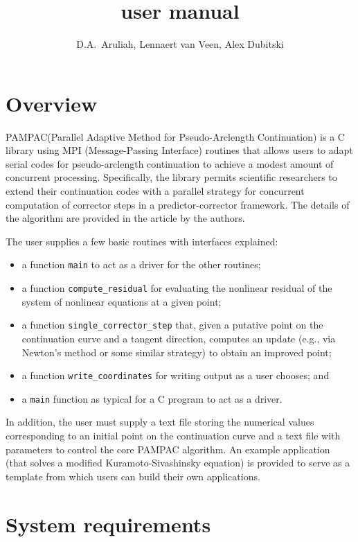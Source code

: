 \documentclass{article}
\title{\pampac user manual}
\author{D.A.~Aruliah, Lennaert van Veen, Alex Dubitski}
\date{}
\newcommand{\pampac}{\textsc{PAMPAC}\xspace}
\begin{document}
\maketitle

\section{Overview}

\pampac (Parallel Adaptive Method for Pseudo-Arclength Continuation)
is a C library using MPI (Message-Passing Interface) routines that allows
users to adapt serial codes for pseudo-arclength continuation to achieve
a modest amount of concurrent processing.
%
Specifically, the library permits scientific researchers to extend
their continuation codes with a parallel strategy for concurrent
computation of corrector steps in a predictor-corrector framework.
%
The details of the algorithm are provided in the article \cite{aruliah}
by the authors.


The  user supplies a few basic routines with interfaces explained:
%
\begin{itemize}
\item a function \verb.main. to act as a driver for the other routines;
\item a function \verb.compute_residual. for evaluating the nonlinear residual of the system of nonlinear equations at a given point;
\item a function \verb.single_corrector_step. that, given a putative point on the continuation curve and a tangent direction, computes an update (e.g., via Newton's method or some similar strategy) to obtain an improved point;
\item a function \verb.write_coordinates. for writing output as a user chooses; and
\item a \verb.main. function as typical for a C program to act as a driver.
\end{itemize}

In addition, the user must supply a text file storing the numerical values corresponding to
an initial point on the continuation curve and a text file with parameters to control the core
\pampac algorithm.
%
An example application (that solves a modified Kuramoto-Sivashinsky
equation) is provided to serve as a template from which users can build their own applications.

\section{System requirements}
\end{document}
